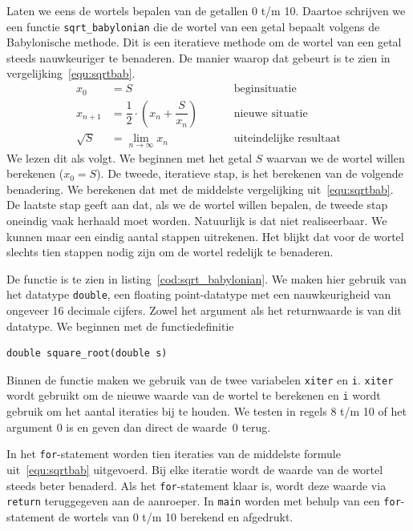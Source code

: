 Laten we eens de wortels bepalen van de getallen 0 t/m 10. Daartoe schrijven we een functie \texttt{sqrt\_babylonian} die de wortel van een getal bepaalt volgens de Babylonische methode. Dit is een iteratieve methode om de wortel van een getal steeds nauwkeuriger te benaderen. De manier waarop dat gebeurt is te zien in vergelijking~\eqref{equ:sqrtbab}.
%
\begin{equation}
\label{equ:sqrtbab}
\begin{split}
x_0 &= S &&&& \text{beginsituatie} \\
x_{n+1} &= \dfrac{1}{2}\cdot\left(x_n + \dfrac{S}{x_n}\right) &&&& \text{nieuwe situatie}\\
\sqrt{S} &= \lim_{n\rightarrow\infty} x_n &&&& \text{uiteindelijke resultaat}
\end{split}
\end{equation}
%
We lezen dit als volgt. We beginnen met het getal $S$ waarvan we de wortel willen berekenen ($x_0= S$). De tweede, iteratieve stap, is het berekenen van de volgende benadering. We berekenen dat met de middelste vergelijking uit~\eqref{equ:sqrtbab}. De laatste stap geeft aan dat, als we de wortel willen bepalen, de tweede stap oneindig vaak herhaald moet worden. Natuurlijk is dat niet realiseerbaar. We kunnen maar een eindig aantal stappen uitrekenen. Het blijkt dat voor de wortel slechts tien stappen nodig zijn om de wortel redelijk te benaderen.

De functie is te zien in listing~\ref{cod:sqrt_babylonian}. We maken hier gebruik van het datatype \texttt{double}, een floating point-datatype met een nauwkeurigheid van ongeveer 16 decimale cijfers. Zowel het argument als het returnwaarde is van dit datatype. We beginnen met de functiedefinitie

\begin{lstlisting}[style=lstoneline]
double square_root(double s)
\end{lstlisting}

Binnen de functie maken we gebruik van de twee variabelen \texttt{xiter} en \texttt{i}. \texttt{xiter} wordt gebruikt om de nieuwe waarde van de wortel te berekenen en \texttt{i} wordt gebruik om het aantal iteraties bij te houden.
We testen in regels 8 t/m 10 of het argument 0 is en geven dan direct de waarde~0 terug.


In het \texttt{for}-statement worden tien iteraties van de middelste formule uit~\eqref{equ:sqrtbab} uitgevoerd. Bij elke iteratie wordt de waarde van de wortel steeds beter benaderd. Als het \texttt{for}-statement klaar is, wordt deze waarde via \texttt{return} teruggegeven aan de aanroeper. In \texttt{main} worden met behulp van een \texttt{for}-statement de wortels van 0 t/m 10 berekend en afgedrukt.


